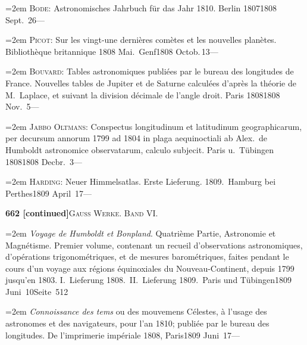 \documentclass[12pt,a4paper]{article}
\begin{document}
{{{{{{{{{{{{\vspace{0.5mm}
\noindent\hangindent=2em
\textsc{Bode}: Astronomisches Jahrbuch f\"ur das Jahr 1810. Berlin 1807\hfill 1808 Sept.\ 26\quad ---

\vspace{0.5mm}
\noindent\hangindent=2em
\textsc{Picot}: Sur les vingt-une derni\`eres com\`etes et les nouvelles plan\`etes. Biblioth\`eque britannique 1808 Mai.\ Genf\hfill 1808 Octob.\,13\quad ---

\vspace{0.5mm}
\noindent\hangindent=2em
\textsc{Bouvard}: Tables astronomiques publi\'ees par le bureau des longitudes de France. Nouvelles tables de Jupiter et de Saturne calcul\'ees d'apr\`es la th\'eorie de M.\ Laplace, et suivant la division d\'ecimale de l'angle droit. Paris 1808\hfill 1808 Nov.\ 5\quad ---

\vspace{0.5mm}
\noindent\hangindent=2em
\textsc{Jabbo Oltmans}: Conspectus longitudinum et latitudinum geographicarum, per decursum annorum 1799 ad 1804 in plaga aequinoctiali ab Alex.\ de Humboldt astronomice observatarum, calculo subjecit. Paris u.\ T\"ubingen 1808\hfill 1808 Decbr.\ 3\quad ---

\vspace{0.5mm}
\noindent\hangindent=2em
\textsc{Harding}: Neuer Himmelsatlas. Erste Lieferung. 1809.\ Hamburg bei Perthes\hfill 1809 April\ 17\quad ---

\newpage

\begin{center}\small\textbf{662 [continued]}\quad\textsc{Gauss Werke. Band VI.}\end{center}

\vspace{0.3cm}

{\small
\noindent\hangindent=2em
\textit{Voyage de Humboldt et Bonpland}. Quatri\`eme Partie, Astronomie et Magn\'etisme. Premier volume, contenant un recueil d'observations astronomiques, d'op\'erations trigonom\'etriques, et de mesures barom\'etriques, faites pendant le cours d'un voyage aux r\'egions \'equinoxiales du Nouveau-Continent, depuis 1799 jusqu'en 1803. I.\ Lieferung 1808.\ II.\ Lieferung 1809.\ Paris und T\"ubingen\hfill 1809 Juni\ 10\quad Seite\ 512

\vspace{0.5mm}
\noindent\hangindent=2em
\textit{Connoissance des tems} ou des mouvemens C\'elestes, \`a l'usage des astronomes et des navigateurs, pour l'an 1810; publi\'ee par le bureau des longitudes. De l'imprimerie imp\'eriale 1808, Paris\hfill 1809 Juni\ 17\quad ---

}}}}}}}}}}}}}
\end{document}
